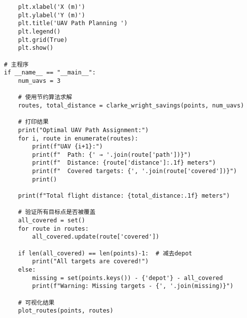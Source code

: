 \documentclass[12pt,fontset=adobe]{ctexart}
\begin{document}
\begin{verbatim}
    plt.xlabel('X (m)')
    plt.ylabel('Y (m)')
    plt.title('UAV Path Planning ')
    plt.legend()
    plt.grid(True)
    plt.show()

# 主程序
if __name__ == "__main__":
    num_uavs = 3
    
    # 使用节约算法求解
    routes, total_distance = clarke_wright_savings(points, num_uavs)
    
    # 打印结果
    print("Optimal UAV Path Assignment:")
    for i, route in enumerate(routes):
        print(f"UAV {i+1}:")
        print(f"  Path: {' → '.join(route['path'])}")
        print(f"  Distance: {route['distance']:.1f} meters")
        print(f"  Covered targets: {', '.join(route['covered'])}")
        print()
    
    print(f"Total flight distance: {total_distance:.1f} meters")
    
    # 验证所有目标点是否被覆盖
    all_covered = set()
    for route in routes:
        all_covered.update(route['covered'])
    
    if len(all_covered) == len(points)-1:  # 减去depot
        print("All targets are covered!")
    else:
        missing = set(points.keys()) - {'depot'} - all_covered
        print(f"Warning: Missing targets - {', '.join(missing)}")
    
    # 可视化结果
    plot_routes(points, routes)
\end{verbatim}
\end{document}
